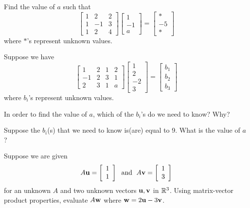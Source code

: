 \item Find the value of $a$ such that 
\[ \left[ \begin{array}{crc} 1 & 2 & 2 \\1 & -1 & 3 \\1 & 2 & 4
\end{array} \right] \left[ \begin{array}{r} 1 \\ -1 \\ a \end{array} \right] = \left[ \begin{array}{r} * \\ -5 \\ * \end{array} \right]\]
where $*$'s represent unknown values.

\item Suppose we have 
\[ \left[ \begin{array}{rccc} 1 & 2 & 1 & 2\\-1 & 2 & 3 & 1\\2&3 & 1 & a
\end{array} \right] \left[ \begin{array}{r} 1 \\ 2 \\ -2 \\ 3 \end{array} \right] = \left[ \begin{array}{c} b_1 \\ b_2\\ b_3 \end{array} \right] \]
where $b_i$'s represent unknown values.
	\ba
	\item In order to find the value of $a$, which of the $b_i$'s do we need to know? Why?
	\item Suppose the $b_i$(s) that we need to know is(are) equal to 9. What is the value of $a$?
	\ea

\item Suppose we are given 
\[ A \mathbf{u} = \left[ \begin{array}{c} 1 \\ 1 \end{array} \right] \; \text{ and } \; A \mathbf{v} = \left[ \begin{array}{c} 1 \\ 3 \end{array} \right] \]
for an unknown $A$ and two unknown vectors $\mathbf{u}, \mathbf{v}$ in $\mathbb{R}^3$. Using matrix-vector product properties, evaluate $A\mathbf{w}$ where $\mathbf{w}=2\mathbf{u}-3\mathbf{v}$.

